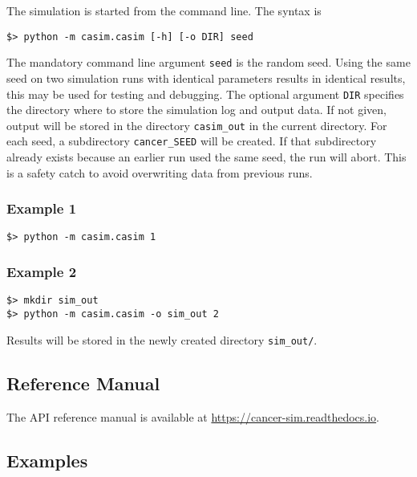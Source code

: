 \documentclass[]{article}
\begin{document}
The simulation is started from the command line. The syntax is

\begin{verbatim}
$> python -m casim.casim [-h] [-o DIR] seed
\end{verbatim}

The mandatory command line argument \texttt{seed} is the random seed.
Using the same seed on two simulation runs with identical parameters
results in identical results, this may be used for testing and
debugging. The optional argument \texttt{DIR} specifies the directory
where to store the simulation log and output data. If not given, output
will be stored in the directory \texttt{casim\_out} in the current
directory. For each seed, a subdirectory \texttt{cancer\_SEED} will be
created. If that subdirectory already exists because an earlier run used
the same seed, the run will abort. This is a safety catch to avoid
overwriting data from previous runs.

\hypertarget{example-1}{%
\subsubsection{Example 1}\label{example-1}}

\begin{verbatim}
$> python -m casim.casim 1
\end{verbatim}

\hypertarget{example-2}{%
\subsubsection{Example 2}\label{example-2}}

\begin{verbatim}
$> mkdir sim_out
$> python -m casim.casim -o sim_out 2
\end{verbatim}

Results will be stored in the newly created directory
\texttt{sim\_out/}.

\hypertarget{reference-manual}{%
\subsection{Reference Manual}\label{reference-manual}}

The API reference manual is available at
\url{https://cancer-sim.readthedocs.io}.

\hypertarget{examples}{%
\subsection{Examples}\label{examples}}
\end{document}
